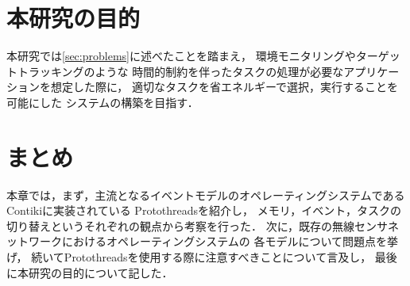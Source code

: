 \section{本研究の目的}\label{sec:objective}
本研究では\ref{sec:problems}に述べたことを踏まえ，
環境モニタリングやターゲットトラッキングのような
時間的制約を伴ったタスクの処理が必要なアプリケーションを想定した際に，
適切なタスクを省エネルギーで選択，実行することを可能にした
システムの構築を目指す．


\section{まとめ}
本章では，まず，主流となるイベントモデルのオペレーティングシステムであるContikiに実装されている
Protothreadsを紹介し，
メモリ，イベント，タスクの切り替えというそれぞれの観点から考察を行った．
次に，既存の無線センサネットワークにおけるオペレーティングシステムの
各モデルについて問題点を挙げ，
続いてProtothreadsを使用する際に注意すべきことについて言及し，
最後に本研究の目的について記した．


